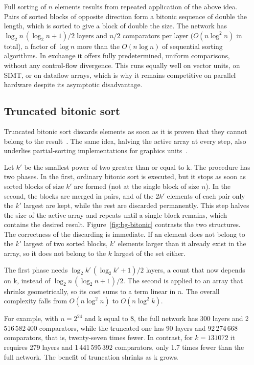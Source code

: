 Full sorting of $n$ elements results from repeated application of the above
idea. Pairs of sorted blocks of opposite direction form a bitonic sequence of
double the length, which is sorted to give a block of double the size. The
network has $\log_2 n \, (\log_2 n + 1)/2$ layers and $n/2$ comparators per
layer ($O(n \log^2 n)$ in total), a factor of $\log n$ more than the $O(n \log
n)$ of sequential sorting algorithms. In exchange it offers fully
predetermined, uniform comparisons, without any control-flow divergence. This
runs equally well on vector units, on SIMT, or on dataflow arrays, which is why
it remains competitive on parallel hardware despite its asymptotic
disadvantage.

\subsection{Truncated bitonic sort}
\label{sec:bg-truncated-bitonic}

Truncated bitonic sort discards elements as soon as it is proven that they
cannot belong to the result~\cite{sismanis2012}. The same idea, halving the
active array at every step, also underlies partial-sorting implementations for
graphics units~\cite{shanbhag2018}.

Let $k'$ be the smallest power of two greater than or equal to k. The procedure
has two phases. In the first, ordinary bitonic sort is executed, but it stops
as soon as sorted blocks of size $k'$ are formed (not at the single block of
size $n$). In the second, the blocks are merged in pairs, and of the $2k'$
elements of each pair only the $k'$ largest are kept, while the rest are
discarded permanently. This step halves the size of the active array and
repeats until a single block remains, which contains the desired result.
Figure~\ref{fig:bg-bitonic} contrasts the two structures. The correctness of
the discarding is immediate. If an element does not belong to the $k'$ largest
of two sorted blocks, $k'$ elements larger than it already exist in the array,
so it does not belong to the $k$ largest of the set either.

The first phase needs $\log_2 k' \, (\log_2 k' + 1)/2$ layers, a count that now
depends on k, instead of $\log_2 n \, (\log_2 n + 1)/2$. The second is applied
to an array that shrinks geometrically, so its cost sums to a term linear in
$n$. The overall complexity falls from $O(n \log^2 n)$ to $O(n \log^2 k)$.

For example, with $n = 2^{24}$ and k equal to 8, the full network has 300
layers and 2\,516\,582\,400 comparators, while the truncated one has 90 layers
and 92\,274\,668 comparators, that is, twenty-seven times fewer. In contrast,
for $k = 131072$ it requires 279 layers and 1\,441\,595\,392 comparators, only
1.7 times fewer than the full network. The benefit of truncation shrinks as k
grows.

